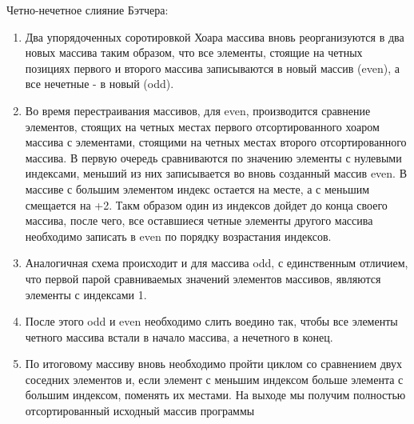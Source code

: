 \documentclass{report}
\begin{document}
\par Четно-нечетное слияние Бэтчера:
\begin{enumerate}
    \item Два упорядоченных соротировкой Хоара массива вновь реорганизуются в два новых массива таким образом, что все элементы, стоящие на четных позициях первого и второго массива записываются в новый массив (even), а все нечетные - в новый (odd).
    \item Во время перестраивания массивов, для even, производится сравнение элементов, стоящих на четных местах первого отсортированного хоаром массива с элементами, стоящими на четных местах второго отсортированного массива.
    В первую очередь сравниваются по значению элементы с нулевыми индексами, меньший из них записывается во вновь созданный массив even. В массиве с большим элементом индекс остается на месте, а с меньшим смещается на +2. Такм образом один из индексов дойдет до конца своего массива, после чего, все оставшиеся четные элементы другого массива необходимо записать в even по порядку возрастания индексов.
    \item Аналогичная схема происходит и для массива odd, с единственным отличием, что первой парой сравниваемых значений элементов массивов, являются элементы с индексами 1.
    \item После этого odd и even необходимо слить воедино так, чтобы все элементы четного массива встали в начало массива, а нечетного в конец.
    \item По итоговому массиву вновь необходимо пройти циклом со сравнением двух соседних элементов и, если элемент с меньшим индексом больше элемента с большим индексом, поменять их местами. На выходе мы получим полностью отсортированный исходный массив программы
\end{enumerate}
\newpage

\end{document}
